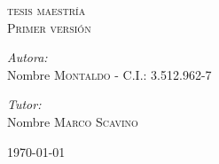 \documentclass[a4paper,12pt]{article} %
\begin{document}
%
\renewcommand{\contentsname}{Tabla de contenidos}      %
\renewcommand{\tablename}{\bfseries Tabla}             %
\renewcommand{\figurename}{\bfseries Figura}           %
\newcommand{\subfigureautorefname}{\figureautorefname} %

\begin{titlepage}
	
	\begin{center}
	
	\textsc{\Large  tesis maestría}\\[1.5cm] %
	
	\textsc{\LARGE Primer versión}\\[0.5cm] %
	
	
	\vspace{-0.5cm}
	
	\noindent
	\begin{flushleft} \large
		\emph{Autora:}\\
		Nombre \textsc{Montaldo} - C.I.: 3.512.962-7 \\

		
		\vspace{0.5cm}
		
		\emph{Tutor:} \\
		Nombre \textsc{Marco Scavino}
	\end{flushleft}
	\vfill
	
	{\large \today}
	
	\end{center}
\end{titlepage}
\end{document}
